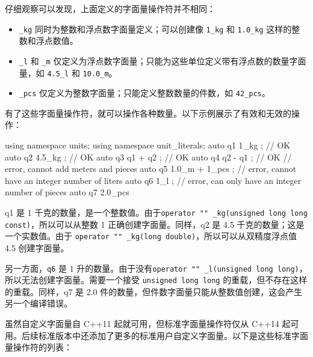 仔细观察可以发现，上面定义的字面量操作符并不相同：

\begin{itemize}
\item
\verb|_kg| 同时为整数和浮点数字面量定义；可以创建像 \verb|1_kg| 和 \verb|1.0_kg| 这样的整数和浮点数值。

\item
\verb|_l| 和 \verb|_m| 仅定义为浮点数字面量；只能为这些单位定义带有浮点数的数量字面量，如 \verb|4.5_l| 和 \verb|10.0_m|。

\item
\verb|_pcs| 仅定义为整数字面量；只能定义整数数量的件数，如 \verb|42_pcs|。
\end{itemize}

有了这些字面量操作符，就可以操作各种数量。以下示例展示了有效和无效的操作：

\begin{cpp}
using namespace units;
using namespace unit_literals;
auto q1{ 1_kg };    // OK
auto q2{ 4.5_kg };  // OK
auto q3{ q1 + q2 }; // OK
auto q4{ q2 - q1 }; // OK
// error, cannot add meters and pieces
auto q5{ 1.0_m + 1_pcs };
// error, cannot have an integer number of liters
auto q6{ 1_l };
// error, can only have an integer number of pieces
auto q7{ 2.0_pcs}
\end{cpp}

q1 是 1 千克的数量，是一个整数值。由于\verb|operator "" _kg(unsigned long long const)|，所以可以从整数 1 正确创建字面量。同样，q2 是 4.5 千克的数量；这是一个实数值。由于 \verb|operator "" _kg(long double)|，所以可以从双精度浮点值 4.5 创建字面量。

另一方面，\verb|q6| 是 1 升的数量。由于没有\verb|operator "" _l(unsigned long long)|，所以无法创建字面量。需要一个接受 \verb|unsigned long long| 的重载，但不存在这样的重载。同样，q7 是 2.0 件的数量，但件数字面量只能从整数值创建，这会产生另一个编译错误。


虽然自定义字面量自 C++11 起就可用，但标准字面量操作符仅从 C++14 起可用。后续标准版本中还添加了更多的标准用户自定义字面量。以下是这些标准字面量操作符的列表：

